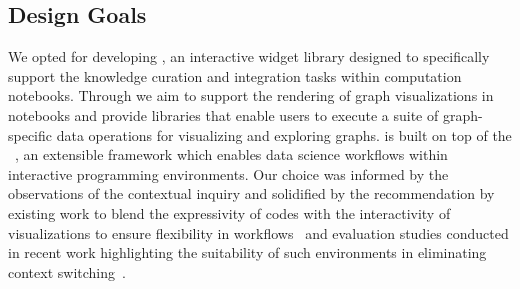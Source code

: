 \subsection{Design Goals}
We opted for developing \system, an interactive widget library designed to specifically support the knowledge curation and integration tasks within computation notebooks. Through \system we aim to support the rendering of graph visualizations in notebooks and provide libraries that enable users to execute a suite of graph-specific data operations for visualizing and exploring graphs. \system is built on top of the \basesystem ~\cite{choi2023towards}, an extensible framework which enables data science workflows within interactive programming environments. Our choice was informed by the observations of the contextual inquiry and solidified by the recommendation by existing work to blend the expressivity of codes with the interactivity of visualizations to ensure flexibility in workflows~\cite{futzing2019moseying} and evaluation studies conducted in recent work highlighting the suitability of such environments in eliminating context switching~\cite{wu2020b2, bauerle2022symphony}. 





